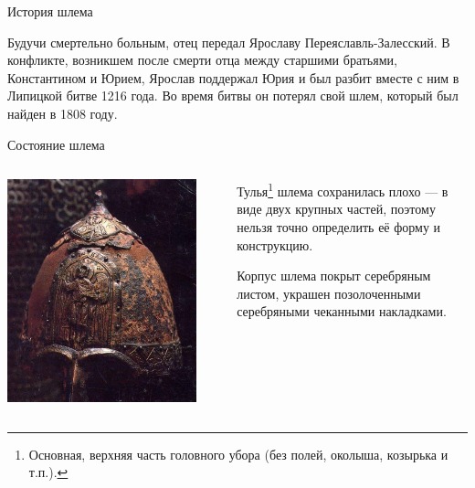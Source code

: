 \begin{frame}{История шлема}

Будучи смертельно больным, отец передал Ярославу Переяславль-Залесский. В конфликте, возникшем после смерти отца между старшими братьями, Константином и Юрием, Ярослав поддержал Юрия и был разбит вместе с ним в Липицкой битве 1216 года. Во время битвы он потерял свой шлем, который был найден в 1808 году.

\end{frame}
\begin{frame}{Состояние шлема}
	\begin{columns}
		\begin{column}{0.45\textwidth}
			\includegraphics[width=0.9\textwidth]{images/shlem-1.jpg}
		\end{column}
		\begin{column}{0.45\textwidth}

			Тулья\footnote{Основная, верхняя часть головного убора (без полей, околыша, козырька и т.п.).} шлема сохранилась плохо — в виде двух крупных частей, поэтому нельзя точно определить её форму и конструкцию.

			Корпус шлема покрыт серебряным листом, украшен позолоченными серебряными чеканными накладками.

		\end{column}
	\end{columns}
\end{frame}
